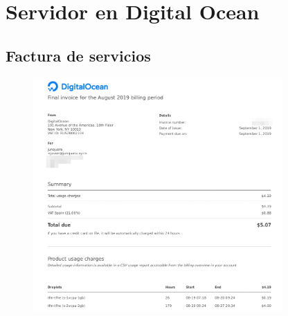 \chapter{Servidor en Digital Ocean}
\label{appendix:server-do}

\section{Factura de servicios}

\begin{figure}[h]
    \centering 
    \includegraphics[width=0.85\textwidth]{apendices/invoice-do.png}
\end{figure}
 
